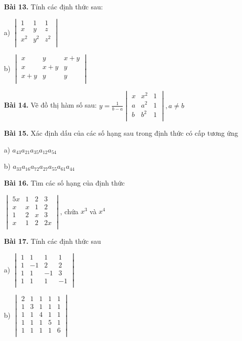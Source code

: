 \documentclass[12pt]{report}
\begin{document}
\textbf{Bài 13.} Tính các định thức sau:

a) $\begin{vmatrix}
	1 & 1 & 1 \\ 
	x & y & z \\
	x^2 & y^2 & z^2 \\
\end{vmatrix}$

b) $\begin{vmatrix}
	x & y & x+y \\ 
	x & x+y & y \\
	x+y & y & y \\
\end{vmatrix}$

\textbf{Bài 14.} Vẽ đồ thị hàm số sau: $y = \frac{1}{b-a}\begin{vmatrix}
	x & x^2 & 1 \\ 
	a & a^2 & 1 \\
	b & b^2 & 1 \\
\end{vmatrix}, a \neq b$

\textbf{Bài 15.} Xác định dấu của các số hạng sau trong định thức có cấp tương ứng 

a) $a_{43}a_{21}a_{35}a_{12}a_{54}$

b) $a_{33}a_{16}a_{72}a_{27}a_{55}a_{61}a_{44}$

\textbf{Bài 16.} Tìm các số hạng của định thức

$\begin{vmatrix}
	5x & 1 & 2 & 3 \\
	x & x & 1 & 2 \\
	1 & 2 & x & 3 \\
	x & 1 & 2 & 2x \\
\end{vmatrix}$, chứa $x^3$ và $x^4$

\textbf{Bài 17.} Tính các định thức sau

a) $\begin{vmatrix}
	1 & 1 & 1 & 1 \\
	1 & -1 & 2 & 2 \\
	1 & 1 & -1 & 3 \\
	1 & 1 & 1 & -1 \\
\end{vmatrix}$

b) $\begin{vmatrix}
	2 & 1 & 1 & 1 & 1 \\
	1 & 3 & 1 & 1 & 1 \\
	1 & 1 & 4 & 1 & 1 \\
	1 & 1 & 1 & 5 & 1 \\
	1 & 1 & 1 & 1 & 6 \\
\end{vmatrix}$
\end{document}
